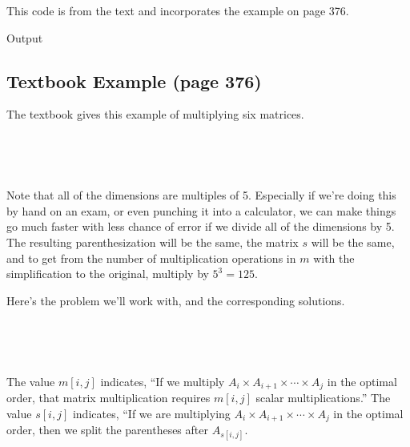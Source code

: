 This code is from the text and incorporates the example on page 376.



Output



\subsection{Textbook Example (page 376)}

The textbook gives this example of multiplying six matrices.  

\


\

Note that all of the dimensions are multiples of 5.  Especially if we're doing this by hand on an exam, or even punching it into a calculator, we can make things go much faster with less chance of error if we divide all of the dimensions by 5.  The resulting parenthesization will be the same, the matrix $s$ will be the same, and to get from the number of multiplication operations in $m$ with the simplification to the original, multiply by $5^3 = 125$.  

Here's the problem we'll work with, and the corresponding solutions.  

\


\



The value $m[i,j]$ indicates, ``If we multiply $A_i \times A_{i+1} \times \cdots \times A_j$ in the optimal order, that matrix multiplication requires $m[i,j]$ scalar multiplications.''  The value $s[i,j]$ indicates, ``If we are multiplying $A_i \times A_{i+1} \times \cdots \times A_j$ in the optimal order, then we split the parentheses after $A_{s[i,j]}$.

